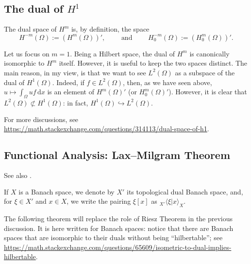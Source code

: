 \documentclass[a4paper,9pt]{amsart}
\newcommand{\did}{\,\mathrm{d}}	%
\newcommand{\into}{\hookrightarrow}		%
\theoremstyle{plain}
\theoremstyle{definition}
\theoremstyle{remark}
\begin{document}
\subsection{The dual of $H^1$}\label{subs68219d8e}
The dual space of $H^m$ is, by definition, the space
\begin{equation}\label{eq68219ddc}
	H^{-m}(\Omega) := (H^m(\Omega))',
	\qquad\text{ and }\qquad
	H^{-m}_0(\Omega) := (H^m_0(\Omega))'.
\end{equation}

Let us focus on $m=1$.
Being a Hilbert space, the dual of $H^m$ is canonically isomorphic to $H^m$ itself.
However, it is useful to keep the two spaces distinct.
The main reason, in my view, is that we want to see $L^2(\Omega)$ as a subspace of the dual of $H^1(\Omega)$.
Indeed, if $f\in L^2(\Omega)$, then, as we have seen above, $u\mapsto \int_\Omega uf \did x$ is an element of $H^m(\Omega)'$ (or $H^m_0(\Omega)'$).
However, it is clear that $L^2(\Omega)\not\subset H^1(\Omega)$: in fact, $H^1(\Omega)\into L^2(\Omega)$.

For more discussions, see\\ \url{https://math.stackexchange.com/questions/314113/dual-space-of-h1}.

\subsection{Functional Analysis: Lax--Milgram Theorem}\label{subs68208c7c}
See also \cite[Aufgabe V.6.18]{MR1787146}.

If $X$ is a Banach space, we denote by $X'$ its topological dual Banach space,
and, for $\xi\in X'$ and $x\in X$, we write the pairing $\xi[x]$ as ${}_{X'}\langle \xi | x \rangle_X$.

The following theorem will replace the role of Riesz Theorem in the previous discussion.
It is here written for Banach spaces:
notice that there are Banach spaces that are isomorphic to their duals without being ``hilbertable'';
see
\url{https://math.stackexchange.com/questions/65609/isometric-to-dual-implies-hilbertable}.
\end{document}
